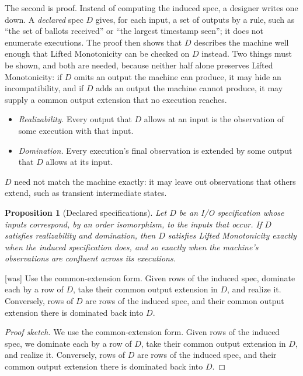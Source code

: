 \documentclass[sigconf]{cidr-2027}
\newtheorem{proposition}{Proposition}
\theoremstyle{remark}
\newcommand{\outrelbase}{extend\xspace}       %
\newcommand{\outrelpast}{extended\xspace}     %
\newcommand{\outnoun}{output extension\xspace}%
\newcommand{\spectype}[1][]{I/O specification#1\xspace}
\begin{document}
The second is proof.  Instead of computing the induced spec, a
designer writes one down.  A \emph{declared} spec $D$ gives, for each
input, a set of outputs by a rule, such as ``the set of ballots received'' or
``the largest timestamp seen''; it does not enumerate executions.  The proof
then shows that $D$ describes the machine well enough that Lifted Monotonicity
can be checked on $D$ instead.  Two things must be shown, and both are needed,
because neither half alone preserves Lifted Monotonicity: if $D$ omits an
output the machine can produce, it may hide an incompatibility, and if $D$
adds an output the machine cannot produce, it may supply a common \outnoun
that no execution reaches.
\begin{itemize}
  \item \emph{Realizability.}  Every output that $D$ allows at an input is the
        observation of some execution with that input.
  \item \emph{Domination.}  Every execution's final observation is
        \outrelpast by some output that $D$ allows at its input.
\end{itemize}
$D$ need not match the machine exactly: it may leave out observations that
others \outrelbase, such as transient intermediate states.

\begin{proposition}[Declared specifications]
\label{prop:declared-specification}
Let $D$ be an \spectype whose inputs correspond, by an order
isomorphism, to the inputs that occur.  If $D$ satisfies realizability and
domination, then $D$ satisfies Lifted Monotonicity exactly when the induced
specification does, and so exactly when the machine's observations are
confluent across its executions.
\end{proposition}



{\footnotesize\color{black!50}\noindent\textsf{[was]} Use the common-extension form.  Given rows of the induced spec,
dominate each by a row of $D$, take their common \outnoun in $D$, and realize
it.  Conversely, rows of $D$ are rows of the induced spec, and their
common \outnoun there is dominated back into $D$.\par}

\color{blue!70!black}\begin{proof}[Proof sketch]
We use the common-extension form.  Given rows of the induced spec, we
dominate each by a row of $D$, take their common \outnoun in $D$, and realize
it.  Conversely, rows of $D$ are rows of the induced spec, and their
common \outnoun there is dominated back into $D$.\color{black}
\end{proof}
\end{document}
